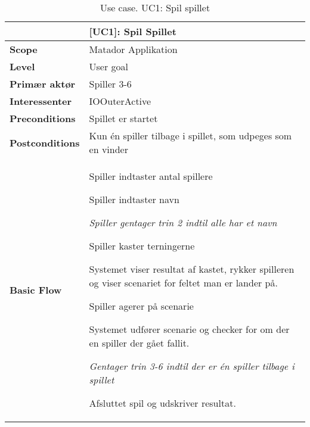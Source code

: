 \documentclass[class=article, crop=false]{standalone}
\makeatletter
\let\savespace\@minipagetrue
\makeatother
\begin{document}
    \begin{table}[H]
        \caption{Use case. UC1: Spil spillet}
        \begin{tabularx}{\textwidth}{|l|X|}
            \hline
                                         & \textbf{[UC1]: Spil Spillet}   \\ \hline
            \textbf{Scope}               & Matador Applikation\\ \hline
            \textbf{Level}               & User goal     \\ \hline
            \textbf{Primær aktør}        & Spiller 3-6   \\ \hline
            \textbf{Interessenter}       & IOOuterActive\\ \hline
            \textbf{Preconditions}       & Spillet er startet \\ \hline
            \textbf{Postconditions}      & Kun én spiller tilbage i spillet,
                                           som udpeges som en vinder\\ \hline





            \textbf{Basic Flow} & \begin{tabenum}
                          \item Spiller indtaster antal spillere
                          \item Spiller indtaster navn
                              \savespace
                                \begin{compactitem}
                                    \item \textit{Spiller gentager trin 2                                                             indtil alle har et navn}
                          \end{compactitem}
                              \item Spiller kaster terningerne
                              \item Systemet viser resultat af kastet, rykker spilleren og viser scenariet for feltet man er lander på.
                              \item Spiller agerer på scenarie
                              \item Systemet udfører scenarie og checker for om der en spiller der gået fallit.
                          \savespace
                          \begin{compactitem}
                              \item \textit{Gentager trin 3-6 indtil der er én spiller tilbage i spillet}
                          \end{compactitem}
                              \item Afsluttet spil og udskriver resultat.
                           \end{tabenum}   \\ \hline





\end{tabularx}
\end{table}
\end{document}
